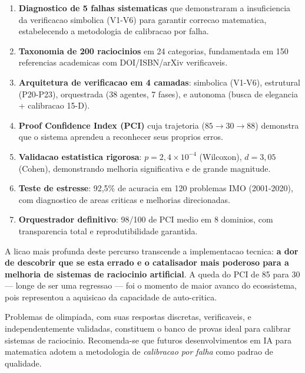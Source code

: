 \documentclass[5p]{elsarticle}
\begin{document}
\begin{enumerate}[label=(\arabic*)]
  \item \textbf{Diagnostico de 5 falhas sistematicas} que demonstraram a
    insuficiencia da verificacao simbolica (V1-V6) para garantir correcao
    matematica, estabelecendo a metodologia de calibracao por falha.
  \item \textbf{Taxonomia de 200 raciocinios} em 24 categorias, fundamentada
    em 150 referencias academicas com DOI/ISBN/arXiv verificaveis.
  \item \textbf{Arquitetura de verificacao em 4 camadas}: simbolica (V1-V6),
    estrutural (P20-P23), orquestrada (38 agentes, 7 fases), e autonoma
    (busca de elegancia + calibracao 15-D).
  \item \textbf{Proof Confidence Index (PCI)} cuja trajetoria ($85\to30\to88$)
    demonstra que o sistema aprendeu a reconhecer seus proprios erros.
  \item \textbf{Validacao estatistica rigorosa}: $p=2,4\times10^{-4}$ (Wilcoxon),
    $d=3,05$ (Cohen), demonstrando melhoria significativa e de grande magnitude.
  \item \textbf{Teste de estresse}: 92,5\% de acuracia em 120 problemas IMO
    (2001-2020), com diagnostico de areas criticas e melhorias direcionadas.
  \item \textbf{Orquestrador definitivo}: 98/100 de PCI medio em 8 dominios,
    com transparencia total e reprodutibilidade garantida.
\end{enumerate}

A licao mais profunda deste percurso transcende a implementacao tecnica:
\textbf{a dor de descobrir que se esta errado e o catalisador mais poderoso
para a melhoria de sistemas de raciocinio artificial}. A queda do PCI de 85
para 30 --- longe de ser uma regressao --- foi o momento de maior avanco do
ecossistema, pois representou a aquisicao da capacidade de auto-critica.

Problemas de olimpiada, com suas respostas discretas, verificaveis, e
independentemente validadas, constituem o banco de provas ideal para calibrar
sistemas de raciocinio. Recomenda-se que futuros desenvolvimentos em IA para
matematica adotem a metodologia de \textit{calibracao por falha} como padrao
de qualidade.
\end{document}

